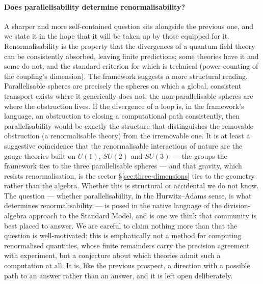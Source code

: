 \paragraph{Does parallelisability determine renormalisability?}
A sharper and more self-contained question sits alongside the previous one, and we state it in the
hope that it will be taken up by those equipped for it. Renormalisability is the property that the
divergences of a quantum field theory can be consistently absorbed, leaving finite predictions; some
theories have it and some do not, and the standard criterion for which is technical (power-counting
of the coupling's dimension). The framework suggests a more structural reading. Parallelisable
spheres are precisely the spheres on which a global, consistent transport exists where it generically
does not; the non-parallelisable spheres are where the obstruction lives. If the divergence of a loop
is, in the framework's language, an obstruction to closing a computational path consistently, then
parallelisability would be exactly the structure that distinguishes the removable obstruction (a
renormalisable theory) from the irremovable one. It is at least a suggestive coincidence that the
renormalisable interactions of nature are the gauge theories built on $U(1)$, $SU(2)$ and $SU(3)$ ---
the groups the framework ties to the three parallelisable spheres --- and that gravity, which resists
renormalisation, is the sector \S\ref{sec:three-dimensions} ties to the geometry rather than the
algebra. Whether this is structural or accidental we do not know. The question --- whether
parallelisability, in the Hurwitz--Adams sense, is what determines renormalisability --- is posed in
the native language of the division-algebra approach to the Standard Model, and is one we think that
community is best placed to answer. We are careful to claim nothing more than that the question is
well-motivated: this is emphatically not a method for computing renormalised quantities, whose finite
remainders carry the precision agreement with experiment, but a conjecture about which theories admit
such a computation at all. It is, like the previous prospect, a direction with a possible path to an
answer rather than an answer, and it is left open deliberately.
